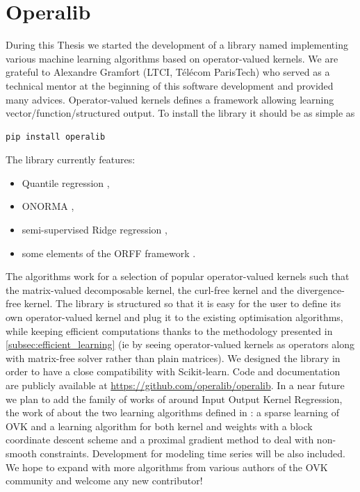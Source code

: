
\section{Operalib}
During this Thesis we started the development of a library named 
implementing various machine learning algorithms based on operator-valued
kernels. We are grateful to Alexandre Gramfort (LTCI, T\'el\'ecom ParisTech)
who served as a technical mentor at the beginning of this software development
and provided many advices.  Operator-valued kernels defines a framework
allowing learning vector/function/structured output.
To install the library it should be as simple as
\begin{lstlisting}[language=bash,caption={Installation of Operalib.}]
pip install operalib
\end{lstlisting}
The library currently features:
\begin{itemize}
    \item Quantile regression \citep{sangnier2016joint},
    \item \acs{ONORMA} \citep{audiffren2013online},
    \item semi-supervised Ridge regression \citep{Brouard2016_jmlr},
    \item some elements of the \acs{ORFF} framework \citep{brault2016random}.
\end{itemize}
The algorithms work for a selection of popular operator-valued kernels such
that the matrix-valued decomposable kernel, the curl-free kernel and the
divergence-free kernel. The library is structured so that it is easy for the
user to define its own operator-valued kernel and plug it to the existing
optimisation algorithms, while keeping efficient computations thanks to the
methodology presented in \cref{subsec:efficient_learning} (\acs{ie} by seeing
operator-valued kernels as operators along with matrix-free solver rather than
plain matrices). We designed the library in order to have a close compatibility
with Scikit-learn. Code and documentation are publicly available at
\url{https://github.com/operalib/operalib}. In a near future we plan to add the
family of works of \citet{Brouard2016_jmlr} around Input Output Kernel
Regression, the  work of \citet{lim2015operator} about the two learning
algorithms defined in \citet{lim2015operator}: a sparse learning of OVK and a
learning algorithm for both kernel and weights with a block coordinate descent
scheme and a proximal gradient method to deal with non-smooth constraints.
Development for modeling time series will be also included. We hope to expand
with more algorithms from various authors of the \acs{OVK} community and
welcome any new contributor!

\chapterend

